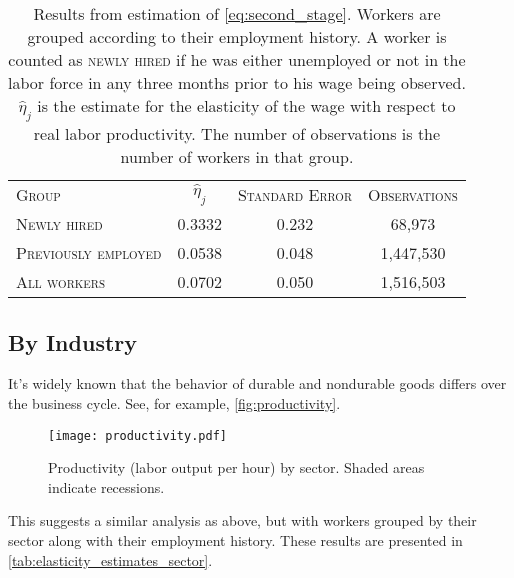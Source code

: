 \documentclass[11pt]{article}
\begin{document}
\begin{table}
    \centering
    \begin{tabular}{lccc} \toprule
        \textsc{Group}               & $\hat{\eta}_j$ & \textsc{Standard Error} & \textsc{Observations}\\
        \textsc{Newly hired}         & 0.3332         & 0.232                   & 68,973       \\
        \textsc{Previously employed} & 0.0538         & 0.048                   & 1,447,530     \\
        \textsc{All workers}         & 0.0702         & 0.050                   & 1,516,503     \\ \bottomrule
    \end{tabular}
    \caption{
                Results from estimation of \autoref{eq:second_stage}.
                Workers are grouped according to their employment history.
                A worker is counted as \textsc{newly hired} if he was either unemployed
                or not in the labor force in any three months prior to his wage
                being observed. $\hat{\eta}_j$ is the estimate for the elasticity of the wage with respect to real labor productivity.
                The number of observations is the number of workers in that group.
            }
    \label{tab:elasticity_estimates}
\end{table}


\subsection{By Industry}

It's widely known that the behavior of durable and nondurable goods differs over the business cycle.
See, for example, \autoref{fig:productivity}.

\begin{figure}
    \begin{center}
      \texttt{[image: productivity.pdf]}
    \end{center}
    \caption{
             Productivity (labor output per hour) by sector. Shaded areas indicate recessions.
            }
    \label{fig:productivity}
\end{figure}

This suggests a similar analysis as above, but with workers grouped by their sector along with their employment history.
These results are presented in \autoref{tab:elasticity_estimates_sector}.
\end{document}
